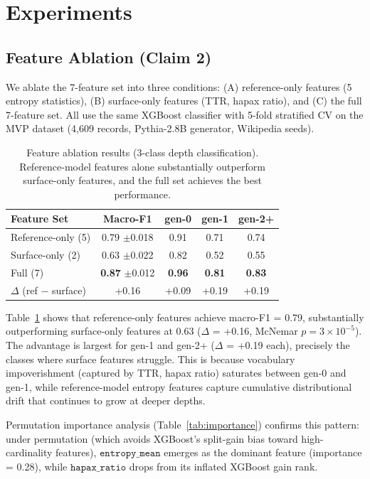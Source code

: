 \documentclass[letterpaper, 10pt]{article}
\begin{document}
\section{Experiments}

\subsection{Feature Ablation (Claim 2)}
\label{sec:ablation}

We ablate the 7-feature set into three conditions: (A) reference-only features (5 entropy statistics), (B) surface-only features (TTR, hapax ratio), and (C) the full 7-feature set.
All use the same XGBoost classifier with 5-fold stratified CV on the MVP dataset (4{,}609 records, Pythia-2.8B generator, Wikipedia seeds).

\begin{table}[t]
\centering
\caption{Feature ablation results (3-class depth classification). Reference-model features alone substantially outperform surface-only features, and the full set achieves the best performance.}
\label{tab:ablation}
\small
\begin{tabular}{@{}lcccc@{}}
\toprule
Feature Set & Macro-F1 & gen-0 & gen-1 & gen-2+ \\
\midrule
Reference-only (5) & 0.79 {\scriptsize$\pm$0.018} & 0.91 & 0.71 & 0.74 \\
Surface-only (2) & 0.63 {\scriptsize$\pm$0.022} & 0.82 & 0.52 & 0.55 \\
Full (7) & \textbf{0.87} {\scriptsize$\pm$0.012} & \textbf{0.96} & \textbf{0.81} & \textbf{0.83} \\
\midrule
$\Delta$ (ref $-$ surface) & +0.16 & +0.09 & +0.19 & +0.19 \\
\bottomrule
\end{tabular}
\end{table}

Table~\ref{tab:ablation} shows that reference-only features achieve macro-F1 = 0.79, substantially outperforming surface-only features at 0.63 ($\Delta$ = +0.16, McNemar $p = 3 \times 10^{-5}$).
The advantage is largest for gen-1 and gen-2+ ($\Delta$ = +0.19 each), precisely the classes where surface features struggle.
This is because vocabulary impoverishment (captured by TTR, hapax ratio) saturates between gen-0 and gen-1, while reference-model entropy features capture cumulative distributional drift that continues to grow at deeper depths.

Permutation importance analysis (Table~\ref{tab:importance}) confirms this pattern: under permutation (which avoids XGBoost's split-gain bias toward high-cardinality features), $\texttt{entropy\_mean}$ emerges as the dominant feature (importance = 0.28), while $\texttt{hapax\_ratio}$ drops from its inflated XGBoost gain rank.
\end{document}
